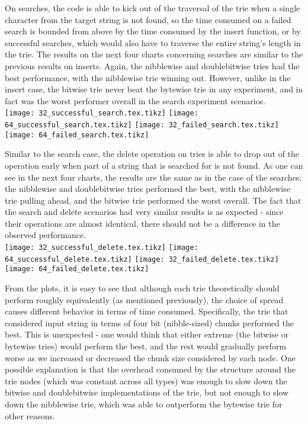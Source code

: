 \documentclass{llncs}
\begin{document}
\newpage
On searches, the code is able to kick out of the traversal of the trie when a single character from the target string is not found, so the time consumed on a failed search is bounded from above by the time consumed by the insert function, or by successful searches, which would also have to traverse the entire string's length in the trie. The results on the next four charts concerning searches are similar to the previous results on inserts. Again, the nibblewise and doublebitwise tries had the best performance, with the nibblewise trie winning out. However, unlike in the insert case, the bitwise trie never beat the bytewise trie in any experiment, and in fact was the worst performer overall in the search experiment scenarios.\\
\texttt{[image: 32\_successful\_search.tex.tikz]}
\texttt{[image: 64\_successful\_search.tex.tikz]}
\texttt{[image: 32\_failed\_search.tex.tikz]}
\texttt{[image: 64\_failed\_search.tex.tikz]}

\newpage
Similar to the search case, the delete operation on tries is able to drop out of the operation early when part of a string that is searched for is not found. As one can see in the next four charts, the results are the same as in the case of the searches: the nibblewise and doublebitwise tries performed the best, with the nibblewise trie pulling ahead, and the bitwise trie performed the worst overall. The fact that the search and delete scenarios had very similar results is as expected - since their operations are almost identical, there should not be a difference in the observed performance.\\
\texttt{[image: 32\_successful\_delete.tex.tikz]}
\texttt{[image: 64\_successful\_delete.tex.tikz]}
\texttt{[image: 32\_failed\_delete.tex.tikz]}
\texttt{[image: 64\_failed\_delete.tex.tikz]}

\newpage
From the plots, it is easy to see that although each trie theoretically should perform roughly equivalently (as mentioned previously), the choice of spread causes different behavior in terms of time consumed. Specifically, the trie that considered input string in terms of four bit (nibble-sized) chunks performed the best. This is unexpected - one would think that either extreme (the bitwise or bytewise tries) would perform the best, and the rest would gradually perform worse as we increased or decreased the chunk size considered by each node. One possible explanation is that the overhead consumed by the structure around the trie nodes (which was constant across all types) was enough to slow down the bitwise and doublebitwise implementations of the trie, but not enough to slow down the nibblewise trie, which was able to outperform the bytewise trie for other reasons.\\
\end{document}
